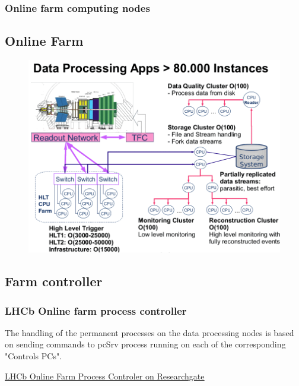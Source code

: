 \documentclass{beamer}
\begin{document}
\begin{frame}
\frametitle{Online farm computing nodes}
\subsection{Online Farm}
\begin{figure}[H]
    	\centering
    	\includegraphics[scale=0.3]{Farm.png}
\end{figure}
\end{frame}



\subsection{Farm controller}
\begin{frame}
\frametitle{LHCb Online farm process controller}

The handling of the permanent processes on the data processing nodes is based on sending commands to pcSrv process running on each of the corresponding "Controls PCs".
\newline


\underline{
\href{https://www.researchgate.net/publication/268357086_The_Process_Controller_for_the_LHCb_On-Line_Farm_Prepared_by}{LHCb Online Farm Process Controler on Researchgate}}

\end{frame}
\end{document}
